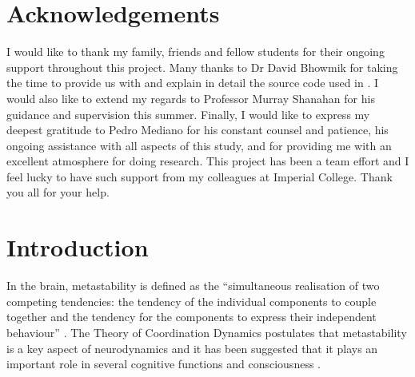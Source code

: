 \documentclass[a4paper,11pt]{article}
\begin{document}
\section{Acknowledgements}
\label{sec:ack}
I would like to thank my family, friends and fellow students for their ongoing support throughout this project. Many thanks to Dr David Bhowmik for taking the time to provide us with and explain in detail the source code used in \cite{Bhowmik2013}. I would also like to extend my regards to Professor Murray Shanahan for his guidance and supervision this summer. Finally, I would like to express my deepest gratitude to Pedro Mediano for his constant counsel and patience, his ongoing assistance with all aspects of this study, and for providing me with an excellent atmosphere for doing research. This project has been a team effort and I feel lucky to have such support from my colleagues at Imperial College. Thank you all for your help.
\clearpage

\tableofcontents
\clearpage

\null
\clearpage

\section{Introduction}
\label{sec:intro}
In the brain, metastability is defined as the ``simultaneous realisation of two competing tendencies: the tendency of the individual components to couple together and the tendency for the components to express their independent behaviour'' \cite{Kelso2012}. The Theory of Coordination Dynamics postulates that metastability is a key aspect of neurodynamics and it has been suggested that it plays an important role in several cognitive functions and consciousness \cite{Seth2009}.
\end{document}
